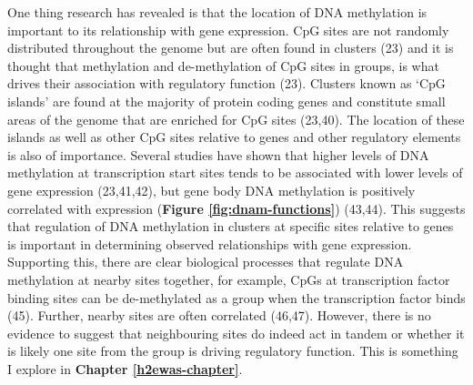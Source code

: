 \documentclass[11pt,oneside]{bristolthesis}
\begin{document}
One thing research has revealed is that the location of DNA methylation is important to its relationship with gene expression. CpG sites are not randomly distributed throughout the genome but are often found in clusters (23) and it is thought that methylation and de-methylation of CpG sites in groups, is what drives their association with regulatory function (23). Clusters known as `CpG islands' are found at the majority of protein coding genes and constitute small areas of the genome that are enriched for CpG sites (23,40). The location of these islands as well as other CpG sites relative to genes and other regulatory elements is also of importance. Several studies have shown that higher levels of DNA methylation at transcription start sites tends to be associated with lower levels of gene expression (23,41,42), but gene body DNA methylation is positively correlated with expression (\textbf{Figure \ref{fig:dnam-functions}}) (43,44). This suggests that regulation of DNA methylation in clusters at specific sites relative to genes is important in determining observed relationships with gene expression. Supporting this, there are clear biological processes that regulate DNA methylation at nearby sites together, for example, CpGs at transcription factor binding sites can be de-methylated as a group when the transcription factor binds (45). Further, nearby sites are often correlated (46,47). However, there is no evidence to suggest that neighbouring sites do indeed act in tandem or whether it is likely one site from the group is driving regulatory function. This is something I explore in \textbf{Chapter \ref{h2ewas-chapter}}.
\end{document}
